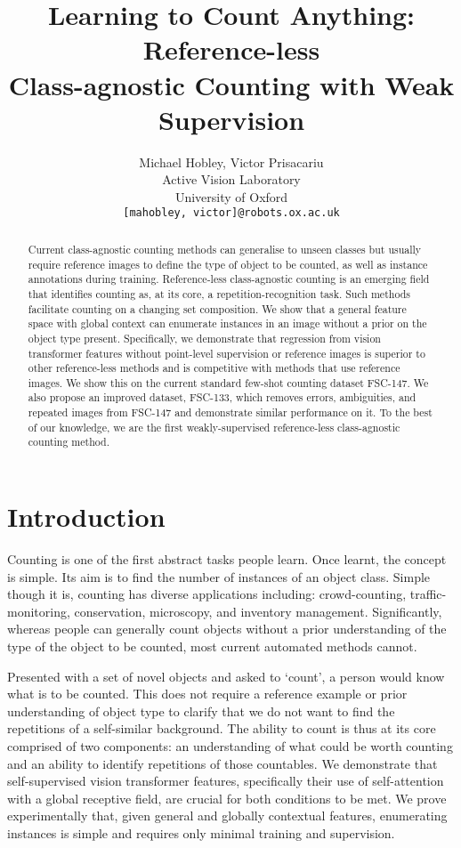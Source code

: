 \documentclass[letterpaper, 11pt]{IEEEtran}
\author{
Michael Hobley, Victor Prisacariu \\ Active Vision Laboratory\\
  University of Oxford\\
  \texttt{[mahobley, victor]@robots.ox.ac.uk} \\
}
\title{Learning to Count Anything: Reference-less \\ Class-agnostic Counting with Weak Supervision}
\begin{document}
\maketitle

\begin{abstract}
Current class-agnostic counting methods can generalise to unseen classes but usually require reference images to define the type of object to be counted, as well as instance annotations during training. Reference-less class-agnostic counting is an emerging field that identifies counting as, at its core, a repetition-recognition task. Such methods facilitate counting on a changing set composition. We show that a general feature space with global context can enumerate instances in an image without a prior on the object type present. Specifically, we demonstrate that regression from vision transformer features without point-level supervision or reference images is superior to other reference-less methods and is competitive with methods that use reference images. We show this on the current standard few-shot counting dataset FSC-147. We also propose an improved dataset, FSC-133, which removes errors, ambiguities, and repeated images from FSC-147 and demonstrate similar performance on it. To the best of our knowledge, we are the first weakly-supervised reference-less class-agnostic counting method. 
\end{abstract}


\section{Introduction}
\label{Introduction}

Counting is one of the first abstract tasks people learn. Once learnt, the concept is simple. Its aim is to find the number of instances of an object class. 
    Simple though it is, counting has diverse applications including: crowd-counting, traffic-monitoring, conservation, microscopy, and inventory management.
    Significantly, whereas people can generally count objects without a prior understanding of the type of the object to be counted, most current automated methods cannot.
    
     Presented with a set of novel objects and asked to `count', a person would know what is to be counted. This does not require a reference example or prior understanding of object type to clarify that we do not want to find the repetitions of a self-similar background.
The ability to count is thus at its core comprised of two components: an understanding of what could be worth counting and an ability to identify repetitions of those countables.
    We demonstrate that self-supervised vision transformer features, specifically their use of self-attention with a global receptive field, are crucial for both conditions to be met. 
    We prove experimentally that, given general and globally contextual features, enumerating instances is simple and  requires only minimal training and supervision. 
    
\end{document}
